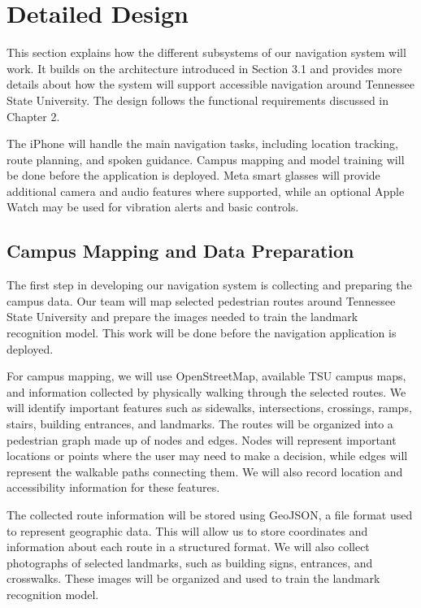 \documentclass[12pt,letterpaper,oneside,reqno]{book}
\theoremstyle{plain}
\theoremstyle{definition}
\theoremstyle{plain}
\theoremstyle{remark}
\theoremstyle{plain}
\theoremstyle{definition}
\theoremstyle{plain}
\begin{document}
\section{Detailed Design}
This section explains how the different subsystems of our navigation system will work. It builds on the architecture introduced in Section 3.1 and provides more details about how the system will support accessible navigation around Tennessee State University. The design follows the functional requirements discussed in Chapter 2.

The iPhone will handle the main navigation tasks, including location tracking, route planning, and spoken guidance. Campus mapping and model training will be done before the application is deployed. Meta smart glasses will provide additional camera and audio features where supported, while an optional Apple Watch may be used for vibration alerts and basic controls.

\subsection{Campus Mapping and Data Preparation    }
The first step in developing our navigation system is collecting and preparing the campus data. Our team will map selected pedestrian routes around Tennessee State University and prepare the images needed to train the landmark recognition model. This work will be done before the navigation application is deployed.

For campus mapping, we will use OpenStreetMap, available TSU campus maps, and information collected by physically walking through the selected routes. We will identify important features such as sidewalks, intersections, crossings, ramps, stairs, building entrances, and landmarks. The routes will be organized into a pedestrian graph made up of nodes and edges. Nodes will represent important locations or points where the user may need to make a decision, while edges will represent the walkable paths connecting them. We will also record location and accessibility information for these features.

The collected route information will be stored using GeoJSON, a file format used to represent geographic data. This will allow us to store coordinates and information about each route in a structured format. We will also collect photographs of selected landmarks, such as building signs, entrances, and crosswalks. These images will be organized and used to train the landmark recognition model.
\end{document}
